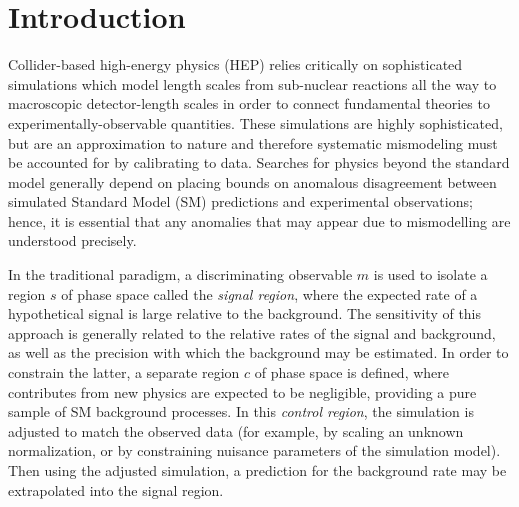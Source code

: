\documentclass[reprint,nofootinbib,...]{revtex4-1}
\begin{document}

\section{Introduction}
Collider-based high-energy physics (HEP) relies critically on sophisticated simulations which model length scales from sub-nuclear reactions all the way to macroscopic detector-length scales in order to connect fundamental theories to experimentally-observable quantities.
These simulations are highly sophisticated, but are an approximation to nature and therefore systematic mismodeling must be accounted for by calibrating to data.
Searches for physics beyond the standard model generally depend on placing bounds on anomalous disagreement between simulated Standard Model (SM) predictions and experimental observations; hence, it is essential that any anomalies that may appear due to mismodelling are understood precisely.

In the traditional paradigm, a discriminating observable $m$ is used to isolate a region $s$ of phase space called the \textit{signal region}, where the expected rate of a hypothetical signal is large relative to the background.
The sensitivity of this approach is generally related to the relative rates of the signal and background, as well as the precision with which the background may be estimated.
In order to constrain the latter, a separate region $c$ of phase space is defined, where contributes from new physics are expected to be negligible, providing a pure sample of SM background processes.
In this \textit{control region}, the simulation is adjusted to match the observed data (for example, by scaling an unknown normalization, or by constraining nuisance parameters of the simulation model).
Then using the adjusted simulation, a prediction for the background rate may be extrapolated into the signal region.

\end{document}
